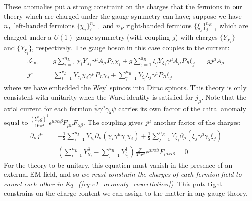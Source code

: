 \documentclass[11pt, oneside]{article}   	%
\theoremstyle{definition}
\numberwithin{equation}{subsection}		%
\begin{document}
These anomalies put a strong constraint on the charges that the fermions in our theory which are charged under the gauge symmetry can have; 
suppose we have $n_L$ left-handed fermions $\{\chi_i\}_{i = 1}^{n_L}$ and $n_R$ right-handed fermions $\{\xi_j\}_{j = 1}^{n_R}$ which are charged 
under a $U(1)$ gauge symmetry (with coupling $g$) with charges $\{Y_{\chi_i}\}$ and $\{Y_{\xi_j}\}$, respectively. The gauge boson in this case couples to the current:
\begin{align}
	\mathcal L_{\mathrm{int}} &= g \sum_{i = 1}^{n_L} \overline \chi_i Y_{\chi_i} \gamma^\mu A_\mu P_L \chi_i + g \sum_{j = 1}^{n_R} \overline\xi_j Y_{\xi_j} \gamma^\mu A_\mu P_R \xi_j 
	=: g j^\mu A_\mu \\
	j^\mu &= \sum_{i = 1}^{n_L} Y_{\chi_i} \overline\chi_i \gamma^\mu P_L\chi_i + \sum_{j = 1}^{n_R} Y_{\xi_j} \overline\xi_j \gamma^\mu P_R\xi_j
\end{align}
where we have embedded the Weyl spinors into Dirac spinors. This theory is only consistent with unitarity when the Ward identity is satisfied 
for $j_\mu$. Note that the axial current for each fermion $\overline\psi \gamma^\mu\gamma_5\psi$ carries its own factor of the chiral anomaly 
equal to $\frac{(Y_\psi^2 g)^2}{16\pi^2} \epsilon^{\mu\nu\alpha\beta} F_{\mu\nu} F_{\alpha\beta}$. The coupling gives $j^\mu$ another factor of the charges:
\begin{align}
	\partial_\mu j^\mu &= -\frac{1}{2} \sum_{i = 1}^{n_L} Y_{\chi_i} \partial_\mu (\overline\chi_i\gamma^\mu\gamma_5 \chi_i) + \frac{1}{2} \sum_{j = 1}^{n_R} Y_{\xi_j} \partial_\mu 
	(\overline\xi_j\gamma^\mu\gamma_5 \xi_j) \nonumber \\
	&= \left(\sum_{i = 1}^{n_L} Y_{\chi_i}^3 - \sum_{j = 1}^{n_R} Y_{\xi_j}^3 \right) \frac{g^2}{32\pi^2}\epsilon^{\mu\nu\alpha\beta} F_{\mu\nu\alpha\beta} = 0
	\label{eq:u1_anomaly_cancellation}
\end{align}
For the theory to be unitary, this equation must vanish in the presence of an external EM field, and so \textit{we must constrain the charges of each 
fermion field to cancel each other in Eq.~(\ref{eq:u1_anomaly_cancellation})}. This puts tight constrains on the charge content we can assign to the matter in 
any gauge theory. 
\end{document}
